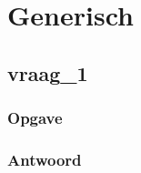 \documentclass[transacties.tex]{subfiles}
\begin{document}
\chapter{Generisch}
\renewcommand\thesection{V\arabic{section}}
\renewcommand\thesubsection{V\arabic{section}}

\section{vraag\_1}
\subsection*{Opgave}
\subsection*{Antwoord}
\end{document}
